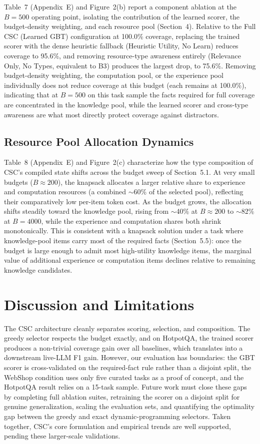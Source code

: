 \documentclass{article}
\begin{document}
Table~7 (Appendix~E) and Figure~2(b) report a component ablation at the $B=500$ operating point, isolating the contribution of the learned scorer, the budget-density weighting, and each resource pool (Section~4). Relative to the Full CSC (Learned GBT) configuration at 100.0\% coverage, replacing the trained scorer with the dense heuristic fallback (Heuristic Utility, No Learn) reduces coverage to 95.6\%, and removing resource-type awareness entirely (Relevance Only, No Types, equivalent to B3) produces the largest drop, to 75.6\%. Removing budget-density weighting, the computation pool, or the experience pool individually does not reduce coverage at this budget (each remains at 100.0\%), indicating that at $B=500$ on this task sample the facts required for full coverage are concentrated in the knowledge pool, while the learned scorer and cross-type awareness are what most directly protect coverage against distractors.

\subsection{Resource Pool Allocation Dynamics}

Table~8 (Appendix~E) and Figure~2(c) characterize how the type composition of CSC's compiled state shifts across the budget sweep of Section~5.1. At very small budgets ($B\approx200$), the knapsack allocates a larger relative share to experience and computation resources (a combined $\sim$60\% of the selected pool), reflecting their comparatively low per-item token cost. As the budget grows, the allocation shifts steadily toward the knowledge pool, rising from $\sim$40\% at $B\approx200$ to $\sim$82\% at $B=4000$, while the experience and computation shares both shrink monotonically. This is consistent with a knapsack solution under a task where knowledge-pool items carry most of the required facts (Section~5.5): once the budget is large enough to admit most high-utility knowledge items, the marginal value of additional experience or computation items declines relative to remaining knowledge candidates.

\section{Discussion and Limitations}

The CSC architecture cleanly separates scoring, selection, and composition. The greedy selector respects the budget exactly, and on HotpotQA, the trained scorer produces a non-trivial coverage gain over all baselines, which translates into a downstream live-LLM F1 gain. However, our evaluation has boundaries: the GBT scorer is cross-validated on the required-fact rule rather than a disjoint split, the WebShop condition uses only five curated tasks as a proof of concept, and the HotpotQA result relies on a 15-task sample. Future work must close these gaps by completing full ablation suites, retraining the scorer on a disjoint split for genuine generalization, scaling the evaluation sets, and quantifying the optimality gap between the greedy and exact dynamic-programming selectors. Taken together, CSC's core formulation and empirical trends are well supported, pending these larger-scale validations.
\end{document}

